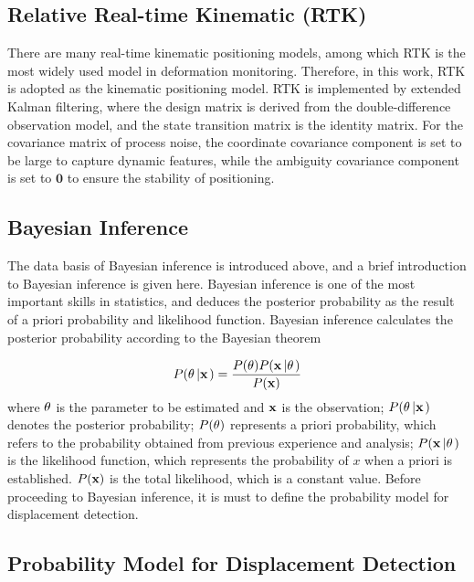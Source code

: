 \documentclass[final,3p,times]{elsarticle}
\begin{document}
	\subsection{Relative Real-time Kinematic (RTK)}
	There are many real-time kinematic positioning models, among which RTK is the most widely used model in deformation monitoring.
	\textcolor{r_s}{Therefore, in this work, RTK is adopted as the kinematic positioning model.
		RTK is implemented by extended Kalman filtering, where the design matrix is derived from the double-difference observation model, and the state transition matrix is the identity matrix.
		For the covariance matrix of process noise, the coordinate covariance component is set to be large to capture dynamic features, while the ambiguity covariance component is set to $\mathbf{0}$ to ensure the stability of positioning\cite{takasu2011rtklib}.
	}
	\subsection{Bayesian Inference}
	\textcolor{r_s}{The data basis of Bayesian inference is introduced above, and a brief introduction to Bayesian inference is given here.}
	Bayesian inference is one of the most important skills in statistics, and deduces the posterior probability as the result of a priori probability and likelihood function\cite{robert2014machine}. Bayesian inference calculates the posterior probability according to the Bayesian theorem\cite{chen2009modulation,chen2013bayesian}
	
	\begin{equation}\label{eq_bayesian_inference}
		P({\bf{\theta }}\left| {\bf{x}} \right.) = \frac{{P({\bf{\theta }})P({\bf{x}}\left| {\bf{\theta }} \right.)}}{{P({\bf{x}})}}
	\end{equation}
	where $\bf{\theta }$ is the parameter to be estimated and $\bf{x}$ is the observation; $P({\bf{\theta }}\left| {\bf{x}} \right.)$ denotes the posterior probability; $P({\bf{\theta }})$ represents a priori probability, which refers to the probability obtained from previous experience and analysis;
	$P({\bf{x}}\left| {\bf{\theta }} \right.)$ is the likelihood function, which represents the probability of $x$ when a priori is established. ${P({\bf{x}})}$ is the total likelihood, which is a constant value.
	\textcolor{r_s}{Before proceeding to Bayesian inference, it is must to define the probability model for displacement detection.}
	\subsection{\textcolor{r_s}{Probability} Model for Displacement Detection}
	
\end{document}

